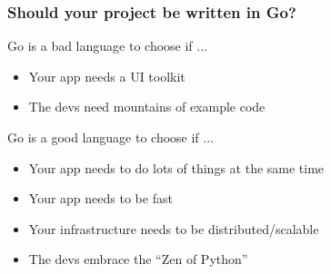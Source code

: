 \documentclass{beamer}
\begin{document}
\begin{frame}
  \frametitle{Should your project be written in Go?}
  Go is a bad language to choose if ...
  \begin{itemize}
    \item Your app needs a UI toolkit
    \item The devs need mountains of example code
  \end{itemize}
  \bigskip
  Go is a good language to choose if ...
  \begin{itemize}
    \item Your app needs to do lots of things at the same time
    \item Your app needs to be fast
    \item Your infrastructure needs to be distributed/scalable
    \item The devs embrace the ``Zen of Python''
  \end{itemize}
\end{frame}
\end{document}
